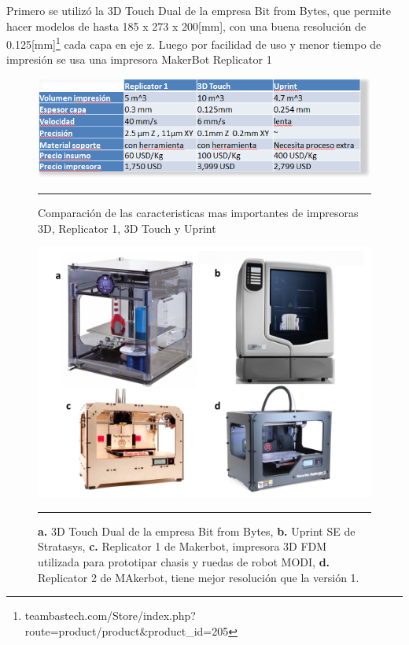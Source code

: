 Primero se utilizó la 3D Touch Dual de la empresa Bit from Bytes, que permite hacer modelos de hasta 185 x 273 x 200[mm], con una buena resolución de 0.125[mm]\footnote{teambastech.com/Store/index.php?route=product/product\&product\_id=205} cada capa en eje z. Luego por facilidad de uso y menor tiempo de impresión se usa una impresora MakerBot Replicator 1

\begin{figure}[htbp]
	\centering
		\includegraphics[width=\textwidth]{./Figures/tabla_impresoras.png}
		\rule{35em}{0.5pt}
	\caption[Tabla comparativa de impresoras 3D]{Comparación de las caracteristicas mas importantes de impresoras 3D, Replicator 1, 3D Touch y Uprint}
	\label{fig:TablaImpresoras}
\end{figure}


\begin{figure}[htbp]
	\centering
		\includegraphics[width=\textwidth]{./Figures/impresoras.png}
		\rule{35em}{0.5pt}
	\caption[Impresoras 3D]{\textbf{a.} 3D Touch Dual de la empresa Bit from Bytes, \textbf{b.} Uprint SE de Stratasys, \textbf{c.} Replicator 1 de Makerbot, impresora 3D FDM utilizada para prototipar chasis y ruedas de robot MODI, \textbf{d.} Replicator 2 de MAkerbot, tiene mejor resolución que la versión 1.}
	\label{fig:impresoras}
\end{figure}	
\FloatBarrier

